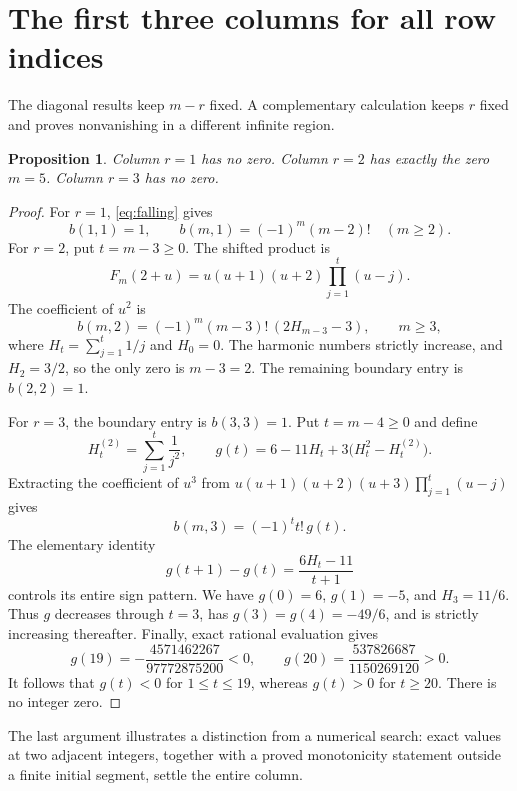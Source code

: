 \documentclass[11pt,a4paper]{article}
\numberwithin{equation}{section}
\newtheorem{proposition}[theorem]{Proposition}
\theoremstyle{definition}
\theoremstyle{remark}
\begin{document}
\section{The first three columns for all row indices}\label{sec:columns}

The diagonal results keep $m-r$ fixed. A complementary calculation keeps
$r$ fixed and proves nonvanishing in a different infinite region.

\begin{proposition}\label{prop:firstcolumns}
Column $r=1$ has no zero. Column $r=2$ has exactly the zero $m=5$.
Column $r=3$ has no zero.
\end{proposition}
\begin{proof}
For $r=1$, \eqref{eq:falling} gives
\[
 b(1,1)=1,\qquad b(m,1)=(-1)^m(m-2)!\quad(m\ge2).
\]
For $r=2$, put $t=m-3\ge0$. The shifted product is
\[
 F_m(2+u)=u(u+1)(u+2)\prod_{j=1}^{t}(u-j).
\]
The coefficient of $u^2$ is
\begin{equation}\label{eq:col2}
 b(m,2)=(-1)^m(m-3)!\,(2H_{m-3}-3),\qquad m\ge3,
\end{equation}
where $H_t=\sum_{j=1}^t1/j$ and $H_0=0$. The harmonic numbers strictly
increase, and $H_2=3/2$, so the only zero is $m-3=2$. The remaining
boundary entry is $b(2,2)=1$.

For $r=3$, the boundary entry is $b(3,3)=1$. Put $t=m-4\ge0$ and define
\[
 H_t^{(2)}=\sum_{j=1}^t\frac1{j^2},\qquad
 g(t)=6-11H_t+3\bigl(H_t^2-H_t^{(2)}\bigr).
\]
Extracting the coefficient of $u^3$ from
$u(u+1)(u+2)(u+3)\prod_{j=1}^t(u-j)$ gives
\begin{equation}\label{eq:col3}
 b(m,3)=(-1)^t t!\,g(t).
\end{equation}
The elementary identity
\begin{equation}\label{eq:gdiff}
 g(t+1)-g(t)=\frac{6H_t-11}{t+1}
\end{equation}
controls its entire sign pattern. We have $g(0)=6$, $g(1)=-5$, and
$H_3=11/6$. Thus $g$ decreases through $t=3$, has
$g(3)=g(4)=-49/6$, and is strictly increasing thereafter.
Finally, exact rational evaluation gives
\[
 g(19)=-\frac{4571462267}{97772875200}<0,\qquad
 g(20)=\frac{537826687}{1150269120}>0.
\]
It follows that $g(t)<0$ for $1\le t\le19$, whereas $g(t)>0$ for
$t\ge20$. There is no integer zero.
\end{proof}

The last argument illustrates a distinction from a numerical search: exact
values at two adjacent integers, together with a proved monotonicity
statement outside a finite initial segment, settle the entire column.
\end{document}
